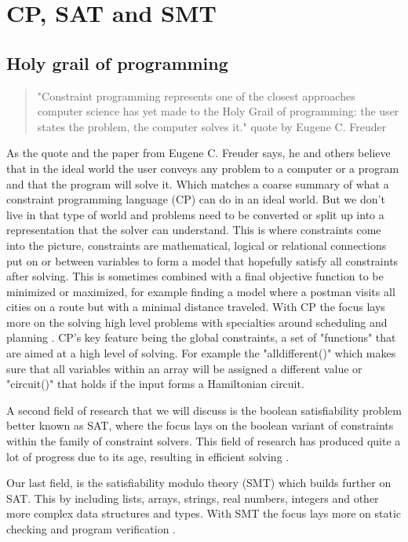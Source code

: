 \chapter{CP, SAT and SMT}
\label{cha:CS}
\label{CS:Intro}
\label{CS:HolyGrail}
\section{Holy grail of programming}
\begin{quote}
	"Constraint programming represents one of the closest approaches computer science has yet made to the Holy Grail of programming: the user states the problem, the computer solves it." \cite{11freuder1997pursuitHolyGrail} quote by Eugene C. Freuder
\end{quote}
As the quote and the paper \cite{11freuder1997pursuitHolyGrail} from Eugene C. Freuder says, he and others believe that in the ideal world the user conveys any problem to a computer or a program and that the program will solve it. Which matches a coarse summary of what a constraint programming language (CP) can do in an ideal world. But we don't live in that type of world and problems need to be converted or split up into a representation that the solver can understand. 
This is where constraints come into the picture, constraints are mathematical, logical or relational connections put on or between variables to form a model that hopefully satisfy all constraints after solving. This is sometimes combined with a final objective function to be minimized or maximized, for example finding a model where a postman visits all cities on a route but with a minimal distance traveled. 
With CP the focus lays more on the solving high level problems with specialties around scheduling and planning \cite{52bartak1999constraint}. CP's key feature being the global constraints, a set of "functions" that are aimed at a high level of solving. For example the "alldifferent()" which makes sure that all variables within an array will be assigned a different value or "circuit()" that holds if the input forms a Hamiltonian circuit.

A second field of research that we will discuss is the boolean satisfiability problem better known as SAT, where the focus lays on the boolean variant of constraints within the family of constraint solvers. This field of research has produced quite a lot of progress due to its age, resulting in efficient solving \cite{56bardin2019bringing}.

Our last field, is the satisfiability modulo theory (SMT) which builds further on SAT. This by including lists, arrays, strings, real numbers, integers and other more complex data structures and types. With SMT the focus lays more on static checking and program verification \cite{56bardin2019bringing, 54moura2008z3}.


